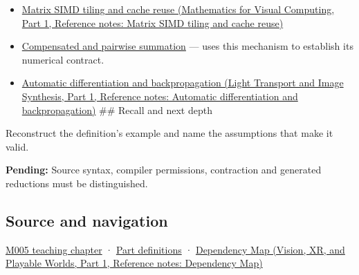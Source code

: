 \hypertarget{appendix-c2ac4a84c283-used-by}{}

\begin{itemize}
\item
  \href{../02-Mathematics-for-Visual-Computing-P01/main.pdf\#appendix-1bfb7c657105}{Matrix SIMD tiling and cache reuse (Mathematics for Visual Computing, Part 1, Reference notes: Matrix SIMD tiling and cache reuse)}
\item
  \hyperref[appendix-df318da57389]{Compensated and pairwise summation} --- uses this mechanism to establish its numerical contract.
\item
  \href{../04-Light-Transport-and-Image-Synthesis-P01/main.pdf\#appendix-40df0855b4a7}{Automatic differentiation and backpropagation (Light Transport and Image Synthesis, Part 1, Reference notes: Automatic differentiation and backpropagation)} \#\# Recall and next depth
\end{itemize}

Reconstruct the definition's example and name the assumptions that make it valid.

\textbf{Pending:} Source syntax, compiler permissions, contraction and generated reductions must be distinguished.

\subsection{Source and navigation}\label{appendix-c2ac4a84c283-source-and-navigation}

\hypertarget{appendix-c2ac4a84c283-source-and-navigation}{}

\hyperref[01-foundations-i-ch001-when-arithmetic-meets-uncertainty]{M005 teaching chapter} · \hyperref[appendix-fd090d982a15-m005---parts-77-88]{Part definitions} · \href{../07-Vision-XR-and-Playable-Worlds-P01/main.pdf\#appendix-4ad47bdd269a}{Dependency Map (Vision, XR, and Playable Worlds, Part 1, Reference notes: Dependency Map)}
